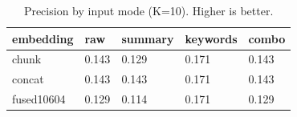 \begin{table}
\caption{Precision by input mode (K=10). Higher is better.}
\label{tab:precision-by-mode}
\begin{tabular}{lllll}
\toprule
embedding & raw & summary & keywords & combo \\
\midrule
chunk & 0.143 & 0.129 & 0.171 & 0.143 \\
concat & 0.143 & 0.143 & 0.171 & 0.143 \\
fused10604 & 0.129 & 0.114 & 0.171 & 0.129 \\
\bottomrule
\end{tabular}
\end{table}

